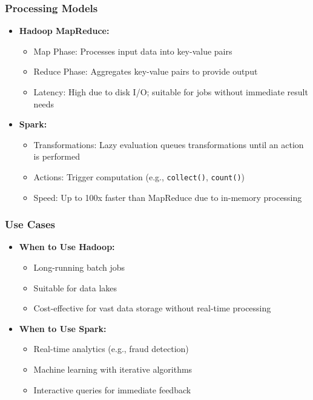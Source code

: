 \documentclass[aspectratio=169]{beamer}
\begin{document}
\begin{frame}[fragile]
    \frametitle{Processing Models}
    \begin{itemize}
        \item \textbf{Hadoop MapReduce:}
        \begin{itemize}
            \item Map Phase: Processes input data into key-value pairs
            \item Reduce Phase: Aggregates key-value pairs to provide output
            \item Latency: High due to disk I/O; suitable for jobs without immediate result needs
        \end{itemize}
        
        \item \textbf{Spark:}
        \begin{itemize}
            \item Transformations: Lazy evaluation queues transformations until an action is performed
            \item Actions: Trigger computation (e.g., \texttt{collect()}, \texttt{count()})
            \item Speed: Up to 100x faster than MapReduce due to in-memory processing
        \end{itemize}
    \end{itemize}
\end{frame}

\begin{frame}[fragile]
    \frametitle{Use Cases}
    \begin{itemize}
        \item \textbf{When to Use Hadoop:}
        \begin{itemize}
            \item Long-running batch jobs
            \item Suitable for data lakes
            \item Cost-effective for vast data storage without real-time processing
        \end{itemize}

        \item \textbf{When to Use Spark:}
        \begin{itemize}
            \item Real-time analytics (e.g., fraud detection)
            \item Machine learning with iterative algorithms
            \item Interactive queries for immediate feedback
        \end{itemize}
    \end{itemize}
\end{frame}
\end{document}
